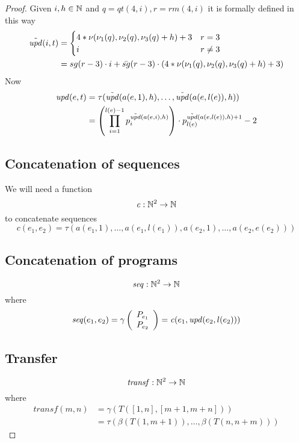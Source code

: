 \begin{theorem}
\begin{proof}
      \newcommand{\qt}[1]{\ensuremath{\mathit{qt}({#1})}}
      \newcommand{\rmf}[1]{\ensuremath{\mathit{rm}({#1})}}

      Given $i,h \in \mathbb{N}$ and $q=\qt{4,i}, r=\rmf{4,i}$ it is formally defined in this way
      \begin{align*}
        \tilde{\mathit{upd}}({i,t}) &= \begin{cases}
          4 * \nu(\nu_1(q), \nu_2(q), \nu_3(q) + h) + 3 & r=3 \\
          i & r \neq 3
        \end{cases} \\
        &= sg(r - 3) \cdot i + \bar{sg}(r - 3) \cdot (4 * \nu(\nu_1(q), \nu_2(q), \nu_3(q) + h) + 3)
      \end{align*}
      Now
      \begin{align*}
        \mathit{upd}({e,t}) &= \tau(\tilde{\mathit{upd}}({a(e,1), h}), \dots, \tilde{\mathit{upd}}({a(e, l(e)), h})) \\
        &= \left(\prod^{l(e)-1}_{i=1}p_i^{\tilde{\mathit{upd}}({a(e,i), h})}\right) \cdot p_{l(e)}^{\tilde{\mathit{upd}}({a(e,l(e)), h}) + 1}-2
      \end{align*}

\subsection*{Concatenation of sequences}
We will need a function
    \newcommand{\conc}[1]{\ensuremath{\mathit{c}({#1})}}
    \[
      \mathit{c}: \mathbb{N}^2 \rightarrow \mathbb{N}
    \]
    to concatenate sequences
    \[
        \conc{e_1, e_2} = \tau(a(e_1,1), \dots, a(e_1,l(e_1)),
        a(e_2,1), \dots, a(e_2, e(e_2)))
    \]
\subsection*{Concatenation of programs}
    \newcommand{\seq}[1]{\ensuremath{\mathit{seq}({#1})}}
    \[
      \mathit{seq} : \mathbb{N}^2 \rightarrow \mathbb{N}
    \]
where
    \[
      \seq{e_1, e_2} = \gamma \left( \begin{array}{c}
                                P_{e_1} \\
                                P_{e_2}
                              \end{array} \right)
                              = \conc{e_1, \up{e_2, l(e_2)}}
    \]

\subsection*{Transfer}
    \newcommand{\tran}[1]{\ensuremath{\mathit{transf}({#1})}}
    \[
      \mathit{transf}: \mathbb{N}^2 \rightarrow \mathbb{N}
    \]
where
\begin{align*}
\tran{m,n} &= \gamma(T([1,n],[m+1, m+n])) \\
&= \tau(\beta(T(1,m+1)), \dots, \beta(T(n,n+m))) 
\end{align*}


\end{proof}
\end{theorem}
